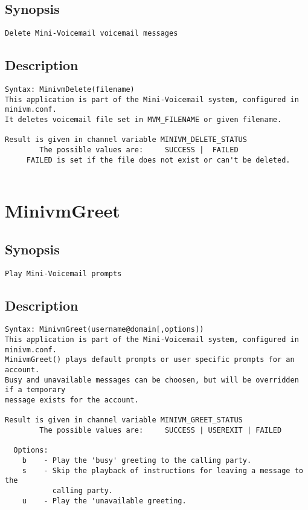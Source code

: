 \subsection{Synopsis}
\begin{verbatim}
Delete Mini-Voicemail voicemail messages
\end{verbatim}
\subsection{Description}
\begin{verbatim}
Syntax: MinivmDelete(filename)
This application is part of the Mini-Voicemail system, configured in minivm.conf.
It deletes voicemail file set in MVM_FILENAME or given filename.

Result is given in channel variable MINIVM_DELETE_STATUS
        The possible values are:     SUCCESS |  FAILED
	 FAILED is set if the file does not exist or can't be deleted.


\end{verbatim}


\section{MinivmGreet}
\subsection{Synopsis}
\begin{verbatim}
Play Mini-Voicemail prompts
\end{verbatim}
\subsection{Description}
\begin{verbatim}
Syntax: MinivmGreet(username@domain[,options])
This application is part of the Mini-Voicemail system, configured in minivm.conf.
MinivmGreet() plays default prompts or user specific prompts for an account.
Busy and unavailable messages can be choosen, but will be overridden if a temporary
message exists for the account.

Result is given in channel variable MINIVM_GREET_STATUS
        The possible values are:     SUCCESS | USEREXIT | FAILED

  Options:
    b    - Play the 'busy' greeting to the calling party.
    s    - Skip the playback of instructions for leaving a message to the
           calling party.
    u    - Play the 'unavailable greeting.


\end{verbatim}


